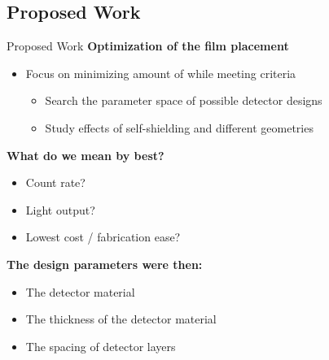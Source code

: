 \subsection{Proposed Work}
\begin{frame}{Proposed Work}
  \large
  \textbf{Optimization of the film placement}
  \normalsize
  \begin{itemize}
    \item Focus on minimizing amount of  while meeting criteria
    \begin{itemize}
      \item Search the parameter space of possible detector designs
      \item Study effects of self-shielding and different geometries
    \end{itemize}
  \end{itemize}
\textbf{What do we mean by best?}
\begin{itemize}
	\small
  \item Count rate? 
  \item Light output?
	\item Lowest cost / fabrication ease?
\end{itemize}
\textbf{The design parameters were then:}
\begin{itemize}
	\small
  \item The detector material
  \item The thickness of the detector material
  \item The spacing of detector layers
\end{itemize}
\end{frame}

